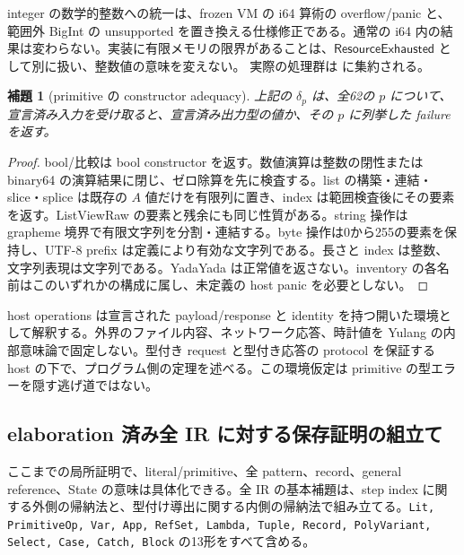 \documentclass[11pt,a4paper]{article}
\newtheorem{lemma}[theorem]{補題}
\theoremstyle{remark}
\newcommand{\src}[2]{\href{https://github.com/momota1029/yulang/blob/a58eefc31e22141574b6f20c6a5748151c6d79f1/#1}{\detokenize{#2}}}
\begin{document}
integer の数学的整数への統一は、frozen VM の i64 算術の overflow/panic と、範囲外 BigInt の unsupported を置き換える仕様修正である。通常の i64 内の結果は変わらない。実装に有限メモリの限界があることは、\(\mathsf{ResourceExhausted}\) として別に扱い、整数値の意味を変えない。
実際の処理群は
\src{crates/evidence-vm/src/runtime.rs\#L24267-L24497}{primitive execution}
に集約される。

\begin{lemma}[primitive の constructor adequacy]
上記の \(\delta_p\) は、全62の \(p\) について、宣言済み入力を受け取ると、宣言済み出力型の値か、その \(p\) に列挙した failure を返す。
\end{lemma}
\begin{proof}
bool/比較は bool constructor を返す。数値演算は整数の閉性または binary64 の演算結果に閉じ、ゼロ除算を先に検査する。list の構築・連結・slice・splice は既存の \(A\) 値だけを有限列に置き、index は範囲検査後にその要素を返す。ListViewRaw の要素と残余にも同じ性質がある。string 操作は grapheme 境界で有限文字列を分割・連結する。byte 操作は0から255の要素を保持し、UTF-8 prefix は定義により有効な文字列である。長さと index は整数、文字列表現は文字列である。YadaYada は正常値を返さない。inventory の各名前はこのいずれかの構成に属し、未定義の host panic を必要としない。
\end{proof}

host operations は宣言された payload/response と identity を持つ開いた環境として解釈する。外界のファイル内容、ネットワーク応答、時計値を Yulang の内部意味論で固定しない。型付き request と型付き応答の protocol を保証する host の下で、プログラム側の定理を述べる。この環境仮定は primitive の型エラーを隠す逃げ道ではない。

\subsection{elaboration 済み全 IR に対する保存証明の組立て}

ここまでの局所証明で、literal/primitive、全 pattern、record、general reference、State の意味は具体化できる。全 IR の基本補題は、step index に関する外側の帰納法と、型付け導出に関する内側の帰納法で組み立てる。\texttt{Lit, PrimitiveOp, Var, App, RefSet, Lambda, Tuple, Record, PolyVariant, Select, Case, Catch, Block} の13形をすべて含める。
\end{document}

